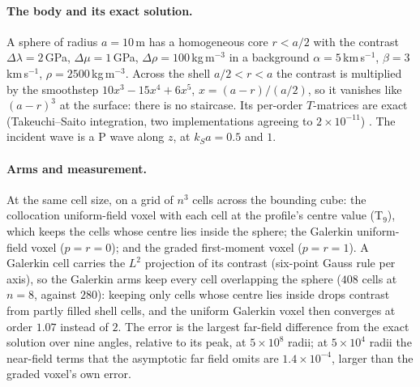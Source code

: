 \documentclass[11pt,a4paper]{article}
\begin{document}
\paragraph{The body and its exact solution.} A sphere of radius $a=10$\,m has a homogeneous core
$r<a/2$ with the contrast $\Delta\lambda=2$\,GPa, $\Delta\mu=1$\,GPa, $\Delta\rho=100$\,kg\,m$^{-3}$ in a
background $\alpha=5$\,km\,s$^{-1}$, $\beta=3$\,km\,s$^{-1}$, $\rho=2500$\,kg\,m$^{-3}$. Across the shell
$a/2<r<a$ the contrast is multiplied by the smoothstep $10x^3-15x^4+6x^5$, $x=(a-r)/(a/2)$, so it vanishes
like $(a-r)^3$ at the surface: there is no staircase. Its per-order $T$-matrices are exact (Takeuchi--Saito
integration, two implementations agreeing to $2\times10^{-11}$) \citep{NestorError2026}. The incident
wave is a P wave along $z$, at $k_Sa=0.5$ and $1$.

\paragraph{Arms and measurement.} At the same cell size, on a grid of $n^3$ cells across the bounding
cube: the collocation uniform-field voxel with each cell at the profile's centre value (T$_9$), which keeps
the cells whose centre lies inside the sphere; the Galerkin uniform-field voxel ($p=r=0$); and the graded
first-moment voxel ($p=r=1$). A Galerkin cell carries the $L^2$ projection of its contrast (six-point Gauss
rule per axis), so the Galerkin arms keep every cell overlapping the sphere ($408$ cells at $n=8$, against
$280$): keeping only cells whose centre lies inside drops contrast from partly filled shell cells, and the
uniform Galerkin voxel then converges at order $1.07$ instead of $2$. The error is the largest far-field difference from the exact
solution over nine angles, relative to its peak, at $5\times10^{8}$ radii; at $5\times10^{4}$ radii the
near-field terms that the asymptotic far field omits are $1.4\times10^{-4}$, larger than the graded
voxel's own error.
\end{document}

